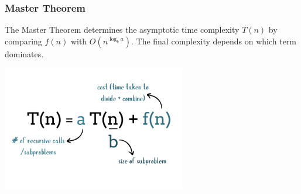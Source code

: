 \documentclass[10pt,aspectratio=43]{beamer}
\begin{document}

%    
%    
%

\begin{frame}
  \frametitle{Master Theorem}
  The Master Theorem determines the asymptotic time complexity $T(n)$ by comparing $f(n)$ with $O(n^{\log_b a})$. The final complexity depends on which term dominates.
  \begin{center}
      \includegraphics[width=0.6\textwidth]{figures/MasterTheorem/mt.jpg}
   \end{center}
  
\end{frame}
\end{document}
